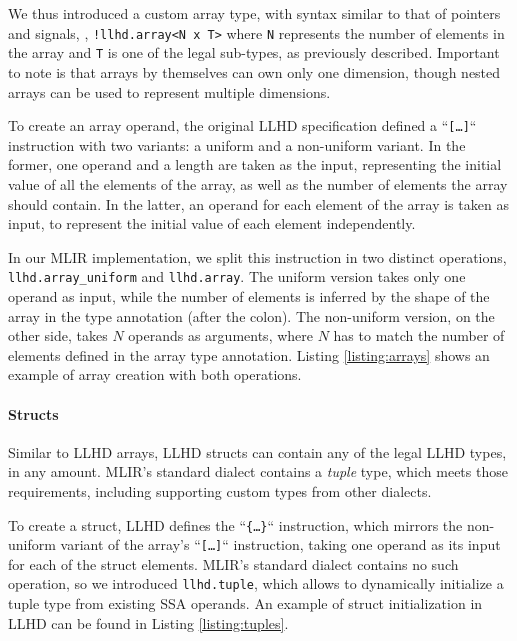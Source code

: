 We thus introduced a custom array type, with syntax similar to that of pointers and signals, \ie, \texttt{!llhd.array<N x T>} where  \texttt{N} represents the number of elements in the array and \texttt{T} is one of the legal sub-types, as previously described. Important to note is that arrays by themselves can own only one dimension, though nested arrays can be used to represent multiple dimensions.

To create an array operand, the original LLHD specification defined a “\texttt{[\ldots]}“ instruction with two variants: a uniform and a non-uniform variant. In the former, one operand and a length are taken as the input, representing the initial value of all the elements of the array, as well as the number of elements the array should contain. In the latter, an operand for each element of the array is taken as input, to represent the initial value of each element independently.

In our MLIR implementation, we split this instruction in two distinct operations, \texttt{llhd.array\_uniform} and \texttt{llhd.array}. The uniform version takes only one operand as input, while the number of elements is inferred by the shape of the array in the type annotation (after the colon). The non-uniform version, on the other side, takes $N$ operands as arguments, where $N$ has to match the number of elements defined in the array type annotation. Listing \ref{listing:arrays} shows an example of array creation with both operations.


\paragraph{Structs}
Similar to LLHD arrays, LLHD structs can contain any of the legal LLHD types, in any amount. MLIR's standard dialect contains a \textit{tuple} type, which meets those requirements, including supporting custom types from other dialects.

To create a struct, LLHD defines the “\texttt{\{\ldots\}}“ instruction, which mirrors the non-uniform variant of the array's “\texttt{[\ldots]}“ instruction, taking one operand as its input for each of the struct elements. MLIR's standard dialect contains no such operation, so we introduced \texttt{llhd.tuple}, which allows to dynamically initialize a tuple type from existing SSA operands. An example of struct initialization in LLHD can be found in Listing \ref{listing:tuples}.

